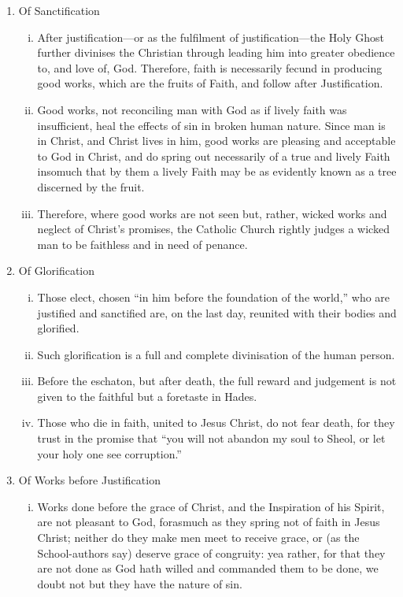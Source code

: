 \begin{enumerate}
\begin{enumerate}[i.]
	\end{enumerate}
	\item Of Sanctification
	\begin{enumerate}[i.]
		\item After justification---or as the fulfilment of justification---the Holy Ghost further divinises the Christian through leading him into greater obedience to, and love of, God. Therefore, faith is necessarily fecund in producing good works, which are the fruits of Faith, and follow after Justification.
		\item Good works, not reconciling man with God as if lively faith was insufficient, heal the effects of sin in broken human nature. Since man is in Christ, and Christ lives in him, good works are pleasing and acceptable to God in Christ, and do spring out necessarily of a true and lively Faith insomuch that by them a lively Faith may be as evidently known as a tree discerned by the fruit.
		\item Therefore, where good works are not seen but, rather, wicked works and neglect of Christ's promises, the Catholic Church rightly judges a wicked man to be faithless and in need of penance.
	\end{enumerate}
	\item Of Glorification
	\begin{enumerate}[i.]
		\item Those elect, chosen ``in him before the foundation of the world,'' who are justified and sanctified are, on the last day, reunited with their bodies and glorified.
		\item Such glorification is a full and complete divinisation of the human person.
		\item Before the eschaton, but after death, the full reward and judgement is not given to the faithful but a foretaste in Hades.
		\item Those who die in faith, united to Jesus Christ, do not fear death, for they trust in the promise that ``you will not abandon my soul to Sheol, or let your holy one see corruption.''
	\end{enumerate}
	\item Of Works before Justification
	\begin{enumerate}[i.]
		\item Works done before the grace of Christ, and the Inspiration of his Spirit, are not pleasant to God, forasmuch as they spring not of faith in Jesus Christ; neither do they make men meet to receive grace, or (as the School-authors say) deserve grace of congruity: yea rather, for that they are not done as God hath willed and commanded them to be done, we doubt not but they have the nature of sin.

\end{enumerate}
\end{enumerate}
